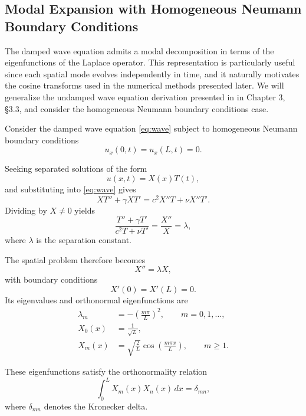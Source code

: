 \documentclass{Configuration_Files/PoliMi3i_thesis}
\begin{document}
\subsection{Modal Expansion with Homogeneous Neumann Boundary Conditions} \label{sec:modal_expansion}

The damped wave equation admits a modal decomposition in terms of the eigenfunctions of the Laplace operator.
This representation is particularly useful since each spatial mode evolves independently in time, and it naturally motivates the cosine transforms used in the numerical methods presented later. We will generalize the undamped wave equation derivation presented in \cite{asmar_partial_2005} in Chapter 3, §3.3, and consider the homogeneous Neumann boundary conditions case.

Consider the damped wave equation \eqref{eq:wave} subject to homogeneous Neumann boundary conditions
\begin{equation*}
u_x(0,t)=u_x(L,t)=0.
\end{equation*}

Seeking separated solutions of the form
\begin{equation*}
u(x,t)=X(x)T(t),
\end{equation*}
and substituting into \eqref{eq:wave} gives
\begin{equation*}
XT''
+\gamma XT'
=
c^2X''T
+\nu X''T'.
\end{equation*}
Dividing by $X \neq 0$ yields
\begin{equation*}
\frac{T''+\gamma T'}{c^2T+\nu T'}
=
\frac{X''}{X}
=
\lambda,
\end{equation*}
where $\lambda$ is the separation constant.

The spatial problem therefore becomes
\begin{equation*}
X''=\lambda X,
\end{equation*}
with boundary conditions
\begin{equation*}
X'(0)=X'(L)=0.
\end{equation*}
Its eigenvalues and orthonormal eigenfunctions are
\begin{align}
\lambda_m
&=
-\left(\frac{m\pi}{L}\right)^2, \label{eq:eigenvalues}
\qquad
m=0,1,\ldots,
\\
X_0(x)
&=
\frac1{\sqrt L},
\\
X_m(x)
&=
\sqrt{\frac2L}
\cos\!\left(\frac{m\pi x}{L}\right),
\qquad
m\ge1.
\end{align}

These eigenfunctions satisfy the orthonormality relation
\begin{equation*}
\int_0^L
X_m(x)X_n(x)\,dx
=
\delta_{mn},
\end{equation*}
where $\delta_{mn}$ denotes the Kronecker delta.
\end{document}

